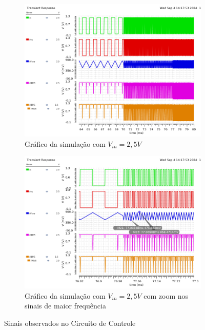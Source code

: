 \begin{figure}[htb]
\begin{subfigure}[b]{0.49\textwidth}
	  \centering
	  \includegraphics[width=\textwidth]{figuras/imgs_jv/waves_2-5_parte1.png}       
    \caption{Gráfico da simulação com $V_{in}=2,5V$}
    \label{fig22}
   \end{subfigure}
	 \begin{subfigure}[b]{0.49\textwidth}
	  \centering
	  \includegraphics[width=\textwidth]{figuras/imgs_jv/waves_2-5_parte2.png}       
    \caption{Gráfico da simulação com $V_{in}=2,5V$ com zoom nos sinais de maior frequência}
    \label{fig23}
   \end{subfigure}
	\caption{Sinais observados no Circuito de Controle }
	\label{fig24}
\end{figure}



